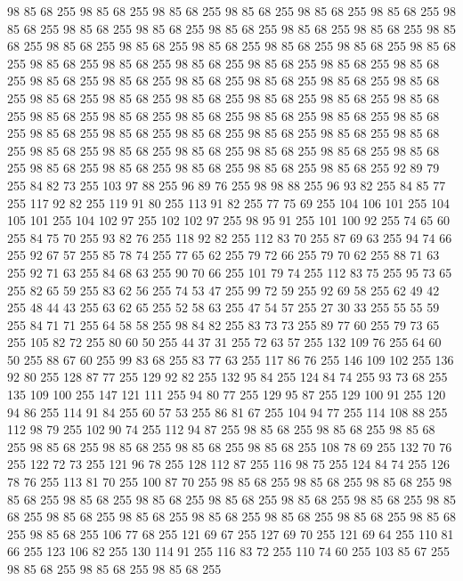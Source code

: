 98 85 68 255 98 85 68 255 98 85 68 255 98 85 68 255 98 85 68 255 98 85 68 255 98 85 68 255 98 85 68 255 98 85 68 255 98 85 68 255 98 85 68 255 98 85 68 255 98 85 68 255 98 85 68 255 98 85 68 255 98 85 68 255 98 85 68 255 98 85 68 255 98 85 68 255 98 85 68 255 98 85 68 255 98 85 68 255 98 85 68 255 98 85 68 255 98 85 68 255 98 85 68 255 98 85 68 255 98 85 68 255 98 85 68 255 98 85 68 255 98 85 68 255 98 85 68 255 98 85 68 255 98 85 68 255 98 85 68 255 98 85 68 255 98 85 68 255 98 85 68 255 98 85 68 255 98 85 68 255 98 85 68 255 98 85 68 255 98 85 68 255 98 85 68 255 98 85 68 255 98 85 68 255 98 85 68 255 98 85 68 255 98 85 68 255 98 85 68 255 98 85 68 255 98 85 68 255 98 85 68 255 98 85 68 255 98 85 68 255 98 85 68 255 98 85 68 255 98 85 68 255 98 85 68 255 98 85 68 255 92 89 79 255 84 82 73 255 103 97 88 255 96 89 76 255
98 98 88 255 96 93 82 255 84 85 77 255 117 92 82 255 119 91 80 255 113 91 82 255 77 75 69 255 104 106 101 255 104 105 101 255 104 102 97 255 102 102 97 255 98 95 91 255 101 100 92 255 74 65 60 255 84 75 70 255 93 82 76 255 118 92 82 255 112 83 70 255 87 69 63 255 94 74 66 255 92 67 57 255 85 78 74 255 77 65 62 255 79 72 66 255 79 70 62 255 88 71 63 255 92 71 63 255 84 68 63 255 90 70 66 255 101 79 74 255 112 83 75 255 95 73 65 255 82 65 59 255 83 62 56 255 74 53 47 255 99 72 59 255 92 69 58 255 62 49 42 255 48 44 43 255 63 62 65 255 52 58 63 255 47 54 57 255 27 30 33 255 55 55 59 255 84 71 71 255 64 58 58 255 98 84 82 255 83 73 73 255 89 77 60 255 79 73 65 255 105 82 72 255 80 60 50 255 44 37 31 255 72 63 57 255 132 109 76 255 64 60 50 255 88 67 60 255 99 83 68 255 83 77 63 255 117 86 76 255 146 109 102 255 136 92 80 255 128 87 77 255 129 92 82 255
132 95 84 255 124 84 74 255 93 73 68 255 135 109 100 255 147 121 111 255 94 80 77 255 129 95 87 255 129 100 91 255 120 94 86 255 114 91 84 255 60 57 53 255 86 81 67 255 104 94 77 255 114 108 88 255 112 98 79 255 102 90 74 255 112 94 87 255 98 85 68 255 98 85 68 255 98 85 68 255 98 85 68 255 98 85 68 255 98 85 68 255 98 85 68 255 108 78 69 255 132 70 76 255 122 72 73 255 121 96 78 255 128 112 87 255 116 98 75 255 124 84 74 255 126 78 76 255 113 81 70 255 100 87 70 255 98 85 68 255 98 85 68 255 98 85 68 255 98 85 68 255 98 85 68 255 98 85 68 255 98 85 68 255 98 85 68 255 98 85 68 255 98 85 68 255 98 85 68 255 98 85 68 255 98 85 68 255 98 85 68 255 98 85 68 255 98 85 68 255 98 85 68 255 106 77 68 255 121 69 67 255 127 69 70 255 121 69 64 255 110 81 66 255 123 106 82 255 130 114 91 255 116 83 72 255 110 74 60 255 103 85 67 255 98 85 68 255 98 85 68 255 98 85 68 255
